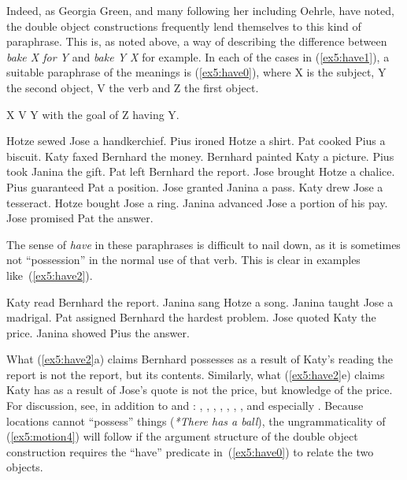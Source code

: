 Indeed, as Georgia Green\cite[]{Green:1974}, and many following her including Oehrle, have noted, the double object constructions frequently lend themselves to this kind of paraphrase. This is, as noted above, a way of describing the difference between \emph{bake X for Y} and \emph{bake Y X} for example. In each of the cases in (\ref{ex5:have1}), a suitable paraphrase of the meanings is (\ref{ex5:have0}), where X is the subject, Y the second object, V the verb and Z the first object.%
%
%
%
\begin{exe}
	\raggedright
	\ex \label{ex5:have0} X V Y with the goal of Z having Y.
	\ex \label{ex5:have1}
	\begin{xlist}
		\ex Hotze sewed Jose a handkerchief.
		\ex Pius ironed Hotze a shirt.
		\ex Pat cooked Pius a biscuit.
		\ex Katy faxed Bernhard the money.
		\ex Bernhard painted Katy a picture.
		\ex Pius took Janina the gift.
		\ex Pat left Bernhard the report.
		\ex Jose brought Hotze a chalice.
		\ex Pius guaranteed Pat a position.
		\ex Jose granted Janina a pass.
		\ex Katy drew Jose a tesseract.
		\ex Hotze bought Jose a ring.
		\ex Janina advanced Jose a portion of his pay.
		\ex Jose promised Pat the answer.
	\end{xlist}
\end{exe}
The sense of \emph{have} in these paraphrases is difficult to nail down, as it is sometimes not ``possession'' in the normal use of that verb. This is clear in examples like~(\ref{ex5:have2}).
\begin{exe}
	\raggedright
	\ex \label{ex5:have2} 
	\begin{xlist}
		\ex Katy read Bernhard the report.
		\ex Janina sang Hotze a song.
		\ex Janina taught Jose a madrigal.
		\ex Pat assigned Bernhard the hardest problem.
		\ex Jose quoted Katy the price.
		\ex Janina showed Pius the answer.
	\end{xlist}
\end{exe}
What (\ref{ex5:have2}a) claims Bernhard possesses as a result of Katy's reading the report is not the report, but its contents. Similarly, what (\ref{ex5:have2}e) claims Katy has as a result of Jose's quote is not the price, but knowledge of the price. For discussion, see, in addition to \citet{Green:1974} and \citet[]{Oehrle:1976}: \citet{Kayne:1984d}, \citet{Harves:2012}, \citet{Manzini:2011}, \citet{Manzini:2016}, \citet{Harley:2004}, \citet{Harley:2015}, \citet{Beavers:2011a}, and especially \citet{Beavers:2009}. Because locations cannot ``possess'' things (\emph{*There has a ball}), the ungrammaticality of (\ref{ex5:motion4}) will follow if the argument structure of the double object construction requires the ``have'' predicate in~(\ref{ex5:have0}) to relate the two objects.

